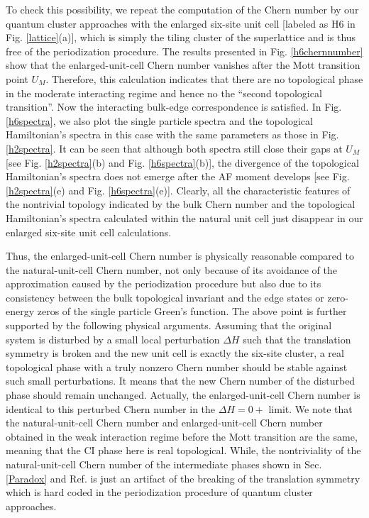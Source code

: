 \documentclass[12pt]{iopart}
\begin{document}
\par To check this possibility, we repeat the computation of the Chern number by our quantum cluster approaches with the enlarged six-site unit cell [labeled as H6 in Fig. \ref{lattice}(a)], which is simply the tiling cluster of the superlattice and is thus free of the periodization procedure. The results presented in Fig. \ref{h6chernnumber} show that the enlarged-unit-cell Chern number vanishes after the Mott transition point $U_M$. Therefore, this calculation indicates that there are no topological phase in the moderate interacting regime and hence no the ``second topological transition''. Now the interacting bulk-edge correspondence is satisfied. In Fig. \ref{h6spectra}, we also plot the single particle spectra and the topological Hamiltonian's spectra in this case with the same parameters as those in Fig. \ref{h2spectra}. It can be seen that although both spectra still close their gaps at $U_M$ [see Fig. \ref{h2spectra}(b) and Fig. \ref{h6spectra}(b)], the divergence of the topological Hamiltonian's spectra does not emerge after the AF moment develops [see Fig. \ref{h2spectra}(e) and Fig. \ref{h6spectra}(e)]. Clearly, all the characteristic features of the nontrivial topology indicated by the bulk Chern number and the topological Hamiltonian's spectra calculated within the natural unit cell just disappear in our enlarged six-site unit cell calculations.

\par Thus, the enlarged-unit-cell Chern number is physically reasonable compared to the natural-unit-cell Chern number, not only because of its avoidance of the approximation caused by the periodization procedure but also due to its consistency between the bulk topological invariant and the edge states or zero-energy zeros of the single particle Green's function. The above point is further supported by the following physical arguments. Assuming that the original system is disturbed by a small local perturbation $\Delta H$ such that the translation symmetry is broken and the new unit cell is exactly the six-site cluster, a real topological phase with a truly nonzero Chern number should be stable against such small perturbations. It means that the new Chern number of the disturbed phase should remain unchanged. Actually, the enlarged-unit-cell Chern number is identical to this perturbed Chern number in the $\Delta H=0+$ limit. We note that the natural-unit-cell Chern number and enlarged-unit-cell Chern number obtained in the weak interaction regime before the Mott transition are the same, meaning that the CI phase here is real topological. While, the nontriviality of the natural-unit-cell Chern number of the intermediate phases shown in Sec. \ref{Paradox} and Ref. \cite{WFSM_PRB2016} is just an artifact of the breaking of the translation symmetry which is hard coded in the periodization procedure of quantum cluster approaches.
\end{document}

